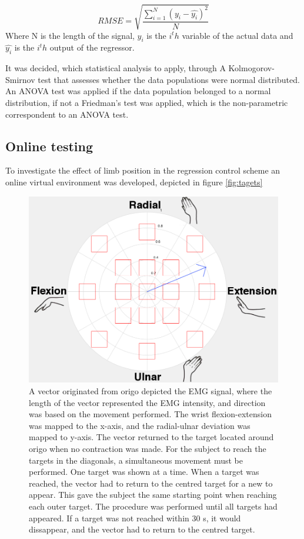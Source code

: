 \begin{equation}\label{eq:rmse}
RMSE = \sqrt{\frac{\sum\limits_{i=1}^N(y_i - \hat{y_i})^2}{N}}
\end{equation}
Where N is the length of the signal, $y_i$ is the $i^th$ variable of the actual data and $\hat{y_i}$ is the $i^th$ output of the regressor.

It was decided, which statistical analysis to apply, through A Kolmogorov-Smirnov test that assesses whether the data populations were normal distributed. An ANOVA test was applied if the data population belonged to a normal distribution, if not a Friedman's test was applied, which is the non-parametric correspondent to an ANOVA test.

\subsection{Online testing}
To investigate the effect of limb position in the regression control scheme an online virtual environment was developed, depicted in figure \ref{fig:tagets}

	\begin{figure}[thpb]
		\centering
		\includegraphics[scale=0.25]{Figures/Target}
		\caption{A vector originated from origo depicted the EMG signal, where the length of the vector represented the EMG intensity, and direction was based on the movement performed. The wrist flexion-extension was mapped to the x-axis, and the radial-ulnar deviation was mapped to y-axis. The vector returned to the target located around origo when no contraction was made. For the subject to reach the targets in the diagonals, a simultaneous movement must be performed. One target was shown at a time. When a target was reached, the vector had to return to the centred target for a new to appear. This gave the subject the same starting point when reaching each outer target. The procedure was performed until all targets had appeared. If a target was not reached within 30 s, it would dissappear, and the vector had to return to the centred target.}
		\label{figurelabel}
	\end{figure}

